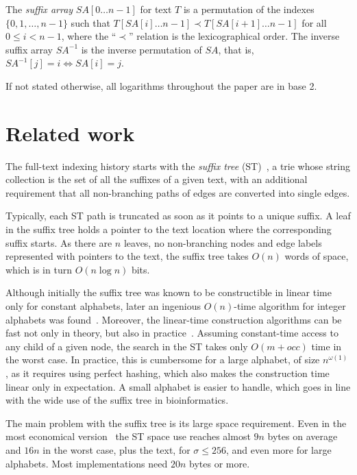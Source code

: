 \documentclass{cai}
\begin{document}
The {\em suffix array} $SA[0 \dots n-1]$ for text $T$ is a permutation 
of the indexes $\{0, 1, \ldots, n-1\}$ such that 
$T[SA[i] \ldots n-1] \prec T[SA[i+1] \ldots n-1]$ for all $0 \leq i < n - 1$, 
where the ``$\prec$'' relation is the lexicographical order.
The inverse suffix array $SA^{-1}$ is the inverse permutation of $SA$, 
that is, $SA^{-1}[j] = i \Leftrightarrow SA[i] = j$.

If not stated otherwise, all logarithms throughout the paper are in base 2.


\section{Related work}
\label{sec:rwork}

The full-text indexing history starts with the {\em suffix tree} 
(ST)~\cite{Wei73}, a trie whose string collection is the set of all the 
suffixes of a given text, with an additional requirement that all 
non-branching paths of edges are converted into single edges. 

Typically, each ST path is truncated as soon as it points to a unique suffix. 
A leaf in the suffix tree holds a pointer to the text location where the 
corresponding suffix starts.
As there are $n$ leaves, no non-branching nodes and edge labels represented 
with pointers to the text, the suffix tree takes $O(n)$ words of space, 
which is in turn $O(n \log n)$ bits.

Although initially the suffix tree was known to be constructible in 
linear time only for constant alphabets, 
later an ingenious $O(n)$-time algorithm for integer 
alphabets was found~\cite{Far97}.
Moreover, the linear-time construction algorithms can 
be fast not only in theory, but also in practice~\cite{Gri07}.
Assuming constant-time access to any child of a given node, 
the search in the ST takes only $O(m + occ)$ time in the worst case.
In practice, this is cumbersome for a large alphabet, 
of size $n^{\omega(1)}$, 
as it requires using 
perfect hashing, which also makes the construction time linear only in expectation.
A small alphabet is easier to handle, which goes in line with the wide 
use of the suffix tree in bioinformatics.

The main problem with the suffix tree 
is its large space requirement.
Even in the most economical version~\cite{KB00} 
the ST space use 
reaches almost $9n$ bytes on average and $16n$ in the worst case, 
plus the text, for $\sigma \leq 256$, and even more for large alphabets.
Most implementations need $20n$ bytes or more.
\end{document}
